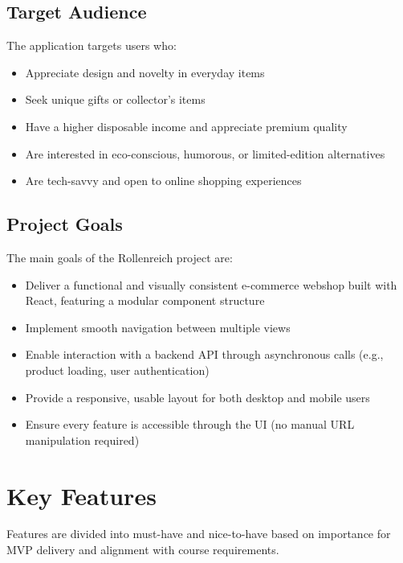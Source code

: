 \documentclass[a4paper,11pt]{article}
\begin{document}
\subsection{Target Audience}
The application targets users who:
\begin{itemize}
    \item Appreciate design and novelty in everyday items
    \item Seek unique gifts or collector’s items
    \item Have a higher disposable income and appreciate premium quality
    \item Are interested in eco-conscious, humorous, or limited-edition alternatives
    \item Are tech-savvy and open to online shopping experiences
\end{itemize}

\subsection{Project Goals}
The main goals of the Rollenreich project are:
\begin{itemize}
    \item Deliver a functional and visually consistent e-commerce webshop built with React, featuring a modular component structure
    \item Implement smooth navigation between multiple views
    \item Enable interaction with a backend API through asynchronous calls (e.g., product loading, user authentication)
    \item Provide a responsive, usable layout for both desktop and mobile users
    \item Ensure every feature is accessible through the UI (no manual URL manipulation required)
\end{itemize}

\section{Key Features}
Features are divided into must-have and nice-to-have based on importance for MVP delivery and alignment with course requirements.
\end{document}
